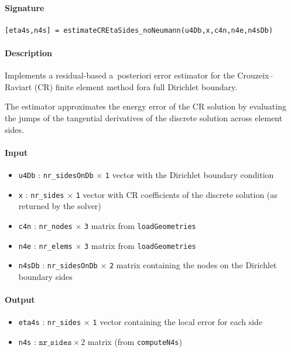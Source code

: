 \documentclass[11pt,a4paper]{article}
\newcommand{\matrixdim}[2]{\texttt{#1} $\times$ \texttt{#2}}
\begin{document}
\paragraph{Signature}
\begin{verbatim}
[eta4s,n4s] = estimateCREtaSides_noNeumann(u4Db,x,c4n,n4e,n4sDb)
\end{verbatim}

\paragraph{Description}
Implements a residual-based a~posteriori error estimator for the Crouzeix--Raviart (CR) finite element method fora full Dirichlet boundary. 

The estimator approximates the energy error of the CR solution by 
evaluating the jumps of the tangential derivatives of the discrete 
solution across element sides.

\paragraph{Input}
\begin{itemize}
    \item \texttt{u4Db} : \matrixdim{nr\_sidesOnDb}{1} vector with the Dirichlet boundary condition
    \item \texttt{x} : \matrixdim{nr\_sides}{1} vector with CR coefficients of the discrete solution (as returned by the solver)
    \item \texttt{c4n} : \matrixdim{nr\_nodes}{3} matrix from \texttt{loadGeometries}
    \item \texttt{n4e} : \matrixdim{nr\_elems}{3} matrix from \texttt{loadGeometries}
    \item \texttt{n4sDb} : \matrixdim{nr\_sidesOnDb}{2} matrix containing the nodes on the Dirichlet boundary sides
\end{itemize}

\paragraph{Output}
\begin{itemize}
    \item \texttt{eta4s} : \matrixdim{nr\_sides}{1} vector containing the local error for each side
    \item \texttt{n4s} : $\texttt{nr\_sides} \times 2$ matrix (from \texttt{computeN4s})
\end{itemize}
\label{software}
\printbibliography[title={Bibliography}, heading=bibintoc]
\end{document}
